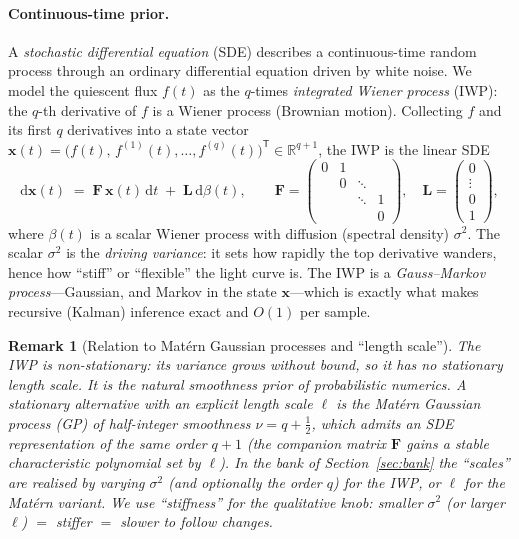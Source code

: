 \documentclass[11pt]{article}
\newtheorem{remark}{Remark}
\newcommand{\R}{\mathbb{R}}
\newcommand{\T}{^{\mathsf{T}}}
\newcommand{\dd}{\mathrm{d}}
\begin{document}
\paragraph{Continuous-time prior.}
A \emph{stochastic differential equation} (SDE) describes a continuous-time random
process through an ordinary differential equation driven by white noise. We model the
quiescent flux $f(t)$ as the $q$-times \emph{integrated Wiener process} (IWP): the
$q$-th derivative of $f$ is a Wiener process (Brownian motion). Collecting $f$ and its
first $q$ derivatives into a state vector
$\bm{x}(t)=\big(f(t),\,f^{(1)}(t),\dots,f^{(q)}(t)\big)\T\in\R^{q+1}$, the IWP is the
linear SDE
\begin{equation}
  \dd \bm{x}(t) \;=\; \bm{F}\,\bm{x}(t)\,\dd t \;+\; \bm{L}\,\dd\beta(t),
  \qquad
  \bm{F}=\begin{pmatrix} 0 & 1 & & \\ & 0 & \ddots & \\ & & \ddots & 1 \\ & & & 0\end{pmatrix},
  \quad
  \bm{L}=\begin{pmatrix}0\\\vdots\\0\\1\end{pmatrix},
  \label{eq:sde}
\end{equation}
where $\beta(t)$ is a scalar Wiener process with diffusion (spectral density)
$\sigma^2$. The scalar $\sigma^2$ is the \emph{driving variance}: it sets how rapidly
the top derivative wanders, hence how ``stiff'' or ``flexible'' the light curve is.
The IWP is a \emph{Gauss--Markov process}---Gaussian, and Markov in the state
$\bm{x}$---which is exactly what makes recursive (Kalman) inference exact and
$O(1)$ per sample.

\begin{remark}[Relation to Mat\'ern Gaussian processes and ``length scale'']
The IWP is non-stationary: its variance grows without bound, so it has no stationary
length scale. It is the natural smoothness prior of probabilistic numerics. A
\emph{stationary} alternative with an explicit length scale $\ell$ is the
Mat\'ern Gaussian process (GP) of half-integer smoothness $\nu=q+\tfrac12$, which
admits an SDE representation of the same order $q{+}1$ (the companion matrix $\bm{F}$
gains a stable characteristic polynomial set by $\ell$). In the bank of
Section~\ref{sec:bank} the ``scales'' are realised by varying $\sigma^2$ (and
optionally the order $q$) for the IWP, or $\ell$ for the Mat\'ern variant. We use
``stiffness'' for the qualitative knob: smaller $\sigma^2$ (or larger $\ell$) $=$
stiffer $=$ slower to follow changes.
\end{remark}
\end{document}
